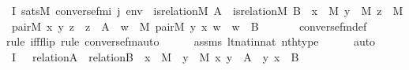 \begin{isabellebody}
\ I{}{\isacharcolon}{\kern0pt}\ {\isachardoublequoteopen}sats{\isacharparenleft}{\kern0pt}M{\isacharcomma}{\kern0pt}\ converse{\isacharunderscore}{\kern0pt}fm{\isacharparenleft}{\kern0pt}i{\isacharcomma}{\kern0pt}\ j{\isacharparenright}{\kern0pt}{\isacharcomma}{\kern0pt}\ env{\isacharparenright}{\kern0pt}\ {\isasymlongleftrightarrow}\ is{\isacharunderscore}{\kern0pt}relation{\isacharparenleft}{\kern0pt}{\isacharhash}{\kern0pt}{\isacharhash}{\kern0pt}M{\isacharcomma}{\kern0pt}\ A{\isacharparenright}{\kern0pt}\ {\isasymand}\ is{\isacharunderscore}{\kern0pt}relation{\isacharparenleft}{\kern0pt}{\isacharhash}{\kern0pt}{\isacharhash}{\kern0pt}M{\isacharcomma}{\kern0pt}\ B{\isacharparenright}{\kern0pt}\ {\isasymand}\ {\isacharparenleft}{\kern0pt}{\isasymforall}x\ {\isasymin}\ M{\isachardot}{\kern0pt}\ {\isasymforall}y\ {\isasymin}\ M{\isachardot}{\kern0pt}\ {\isacharparenleft}{\kern0pt}{\isasymexists}z\ {\isasymin}\ M{\isachardot}{\kern0pt}\ pair{\isacharparenleft}{\kern0pt}{\isacharhash}{\kern0pt}{\isacharhash}{\kern0pt}M{\isacharcomma}{\kern0pt}\ x{\isacharcomma}{\kern0pt}\ y{\isacharcomma}{\kern0pt}\ z{\isacharparenright}{\kern0pt}\ {\isasymand}\ z\ {\isasymin}\ A{\isacharparenright}{\kern0pt}\ {\isasymlongleftrightarrow}\ {\isacharparenleft}{\kern0pt}{\isasymexists}w\ {\isasymin}\ M{\isachardot}{\kern0pt}\ pair{\isacharparenleft}{\kern0pt}{\isacharhash}{\kern0pt}{\isacharhash}{\kern0pt}M{\isacharcomma}{\kern0pt}\ y{\isacharcomma}{\kern0pt}\ x{\isacharcomma}{\kern0pt}\ w{\isacharparenright}{\kern0pt}\ {\isasymand}\ w\ {\isasymin}\ B{\isacharparenright}{\kern0pt}{\isacharparenright}{\kern0pt}{\isachardoublequoteclose}\ \isanewline
\ \ \ \ \isamarkupfalse%
\ converse{\isacharunderscore}{\kern0pt}fm{\isacharunderscore}{\kern0pt}def\ \isanewline
\ \ \ \ \isamarkupfalse%
{\isacharparenleft}{\kern0pt}rule\ iff{\isacharunderscore}{\kern0pt}flip{\isacharcomma}{\kern0pt}\ rule\ converse{\isacharunderscore}{\kern0pt}fm{\isacharunderscore}{\kern0pt}auto{\isacharparenright}{\kern0pt}\isanewline
\ \ \ \ \isamarkupfalse%
\ assms\ lt{\isacharunderscore}{\kern0pt}nat{\isacharunderscore}{\kern0pt}in{\isacharunderscore}{\kern0pt}nat\ nth{\isacharunderscore}{\kern0pt}type\isanewline
\ \ \ \ \isamarkupfalse%
\ auto\isanewline
\ \ \isamarkupfalse%
\ I{}{\isacharcolon}{\kern0pt}\ {\isachardoublequoteopen}{\isachardot}{\kern0pt}{\isachardot}{\kern0pt}{\isachardot}{\kern0pt}\ {\isasymlongleftrightarrow}\ relation{\isacharparenleft}{\kern0pt}A{\isacharparenright}{\kern0pt}\ {\isasymand}\ relation{\isacharparenleft}{\kern0pt}B{\isacharparenright}{\kern0pt}\ {\isasymand}\ {\isacharparenleft}{\kern0pt}{\isasymforall}x\ {\isasymin}\ M{\isachardot}{\kern0pt}\ {\isasymforall}\ y\ {\isasymin}\ M{\isachardot}{\kern0pt}\ {\isacharless}{\kern0pt}x{\isacharcomma}{\kern0pt}\ y{\isachargreater}{\kern0pt}\ {\isasymin}\ A\ {\isasymlongleftrightarrow}\ {\isacharless}{\kern0pt}y{\isacharcomma}{\kern0pt}\ x{\isachargreater}{\kern0pt}\ {\isasymin}\ B{\isacharparenright}{\kern0pt}{\isachardoublequoteclose}\ \isanewline

\end{isabellebody}
